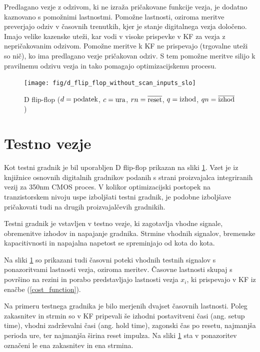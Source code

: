\documentclass[journal,a4paper,twoside]{sty/IEEEtran}
\begin{document}
Predlagano vezje z odzivom, ki ne izraža pričakovane funkcije vezja, je dodatno kaznovano s pomožnimi lastnostmi. Pomožne lastnosti, oziroma meritve preverjajo odziv v časovnih trenutkih, kjer je stanje digitalnega vezja določeno. Imajo velike kazenske uteži, kar vodi v visoke prispevke v KF za vezja z nepričakovanim odzivom. Pomožne meritve k KF ne prispevajo (trgovalne uteži so nič), ko ima predlagano vezje pričakovan odziv. S tem pomožne meritve silijo k pravilnemu odzivu vezja in tako pomagajo optimizacijskemu procesu.

\begin{figure}[t]
\begin{center}
\begin{minipage}[t]{12cm}
\texttt{[image: fig/d\_flip\_flop\_without\_scan\_inputs\_slo]}
\caption{D flip-flop ($d = {\rm podatek}$, $c = {\rm ura}$, $rn = {\overline {\rm reset}}$, $q = {\rm izhod}$, $qn = {\overline {\rm izhod}}$)}
\end{minipage}
\end{center}
\label{d_flip_flop_without_scan_inputs}
\end{figure}

\section{Testno vezje}
Kot testni gradnik je bil uporabljen D flip-flop prikazan na sliki \ref{d_flip_flop_without_scan_inputs}. Vzet je iz knjižnice osnovnih digitalnih gradnikov podanih s strani proizvajalca integriranih vezij za 350nm CMOS proces. V kolikor optimizacijski postopek na tranzistorskem nivoju uspe izboljšati testni gradnik, je podobne izboljšave pričakovati tudi na drugih proizvajalčevih gradnikih.

Testni gradnik je vstavljen v testno vezje, ki zagotavlja vhodne signale, obremenitve izhodov in napajanje gradnika. Strmine vhodnih signalov, bremenske kapacitivnosti in napajalna napetost se spreminjajo od kota do kota. 

Na sliki \ref{d_flip_flop_without_scan_inputs} so prikazani tudi časovni poteki vhodnih testnih signalov s ponazoritvami lastnosti vezja, oziroma meritev. Časovne lastnosti skupaj s površino na rezini in porabo predstavljajo lastnosti vezja $x_i$, ki prispevajo v KF iz enačbe (\ref{cost_function}).

Na primeru testnega gradnika je bilo merjenih dvajset časovnih lastnosti. Poleg zakasnitev in strmin so v KF pripevali še izhodni postavitveni časi (ang. setup time), vhodni zadrževalni časi (ang. hold time), zagonski čas po resetu, najmanjša perioda ure, ter najmanjša širina reset impulza. Na sliki \ref{d_flip_flop_without_scan_inputs} sta v ponazoritev označeni le ena zakasnitev in ena strmina.
\end{document}
